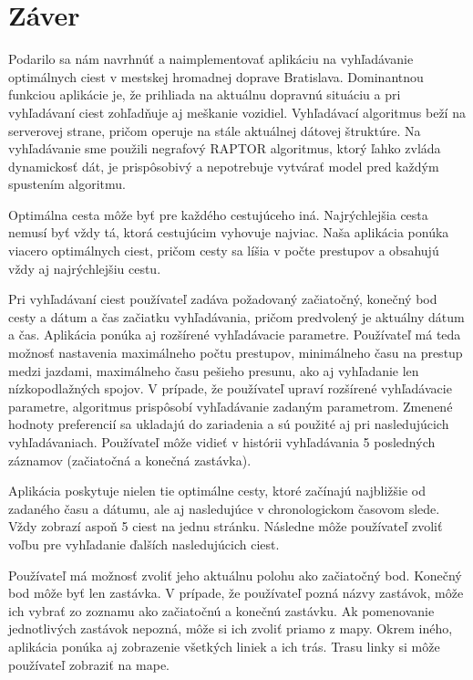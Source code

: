 \chapter*{Záver}  %

Podarilo sa nám navrhnúť a naimplementovať aplikáciu na vyhľadávanie optimálnych ciest v mestskej hromadnej doprave Bratislava. Dominantnou funkciou aplikácie je, že prihliada na aktuálnu dopravnú situáciu a pri vyhľadávaní ciest zohľadňuje aj meškanie vozidiel. Vyhľadávací algoritmus beží na serverovej strane, pričom operuje na stále aktuálnej dátovej štruktúre. Na vyhľadávanie sme použili negrafový RAPTOR algoritmus, ktorý ľahko zvláda dynamickosť dát, je prispôsobivý a nepotrebuje vytvárať model pred každým spustením algoritmu. 

Optimálna cesta môže byť pre každého cestujúceho iná. Najrýchlejšia cesta nemusí byť vždy tá, ktorá cestujúcim vyhovuje najviac. Naša aplikácia ponúka viacero optimálnych ciest, pričom cesty sa líšia v počte prestupov a obsahujú vždy aj najrýchlejšiu cestu.

Pri vyhľadávaní ciest používateľ zadáva požadovaný začiatočný, konečný bod cesty a dátum a čas začiatku vyhľadávania, pričom predvolený je aktuálny dátum a čas. Aplikácia ponúka aj rozšírené vyhľadávacie parametre. Používateľ má teda možnosť nastavenia maximálneho počtu prestupov, minimálneho času na prestup medzi jazdami, maximálneho času pešieho presunu, ako aj vyhľadanie len nízkopodlažných spojov. V prípade, že používateľ upraví rozšírené vyhľadávacie parametre, algoritmus prispôsobí vyhľadávanie zadaným parametrom. Zmenené hodnoty preferencií sa ukladajú do zariadenia a sú použité aj pri nasledujúcich vyhľadávaniach. Používateľ môže vidieť v histórii vyhľadávania 5 posledných záznamov (začiatočná a konečná zastávka). 

Aplikácia poskytuje nielen tie optimálne cesty, ktoré začínajú najbližšie od zadaného času a dátumu, ale aj nasledujúce v chronologickom časovom slede. Vždy zobrazí aspoň 5 ciest na jednu stránku. Následne môže používateľ zvoliť voľbu pre vyhľadanie ďalších nasledujúcich ciest.

Používateľ má možnosť zvoliť jeho aktuálnu polohu ako začiatočný bod. Konečný bod môže byť len zastávka. V prípade, že používateľ pozná názvy zastávok, môže ich vybrať zo zoznamu ako začiatočnú a konečnú zastávku. Ak pomenovanie jednotlivých zastávok nepozná, môže si ich zvoliť priamo z mapy. Okrem iného, aplikácia ponúka aj zobrazenie všetkých liniek a ich trás. Trasu linky si môže používateľ zobraziť na mape. 

